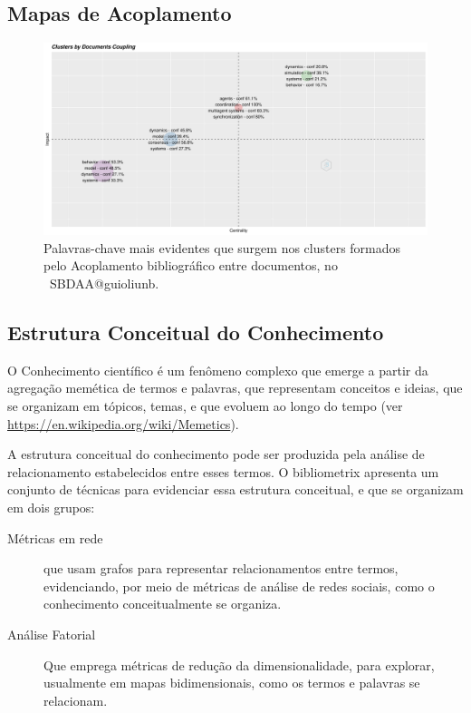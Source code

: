 \subsection{Mapas de Acoplamento}

\begin{figure}
    \centering
    \includegraphics[width=1\textwidth]{experiments/jhcf/PesqBibliogr/SimulacaoMultiagente/WoS-20220203/Clustering/MASSA2-CouplingMap-4Labels-Per-Cluster.png}
    \caption{Palavras-chave mais evidentes que surgem nos clusters formados pelo Acoplamento bibliográfico entre documentos, no  \dataset\ SBDAA@guioliunb.}
    \label{fig:MASSA2-CouplingMap-4Labels-Per-Cluster}
\end{figure}


\subsection{Estrutura Conceitual do Conhecimento}

O Conhecimento científico é um fenômeno complexo que emerge a partir da agregação memética de termos e palavras, que representam conceitos e ideias, que se organizam em tópicos, temas, e que evoluem ao longo do tempo (ver \url{https://en.wikipedia.org/wiki/Memetics}).

A estrutura conceitual do conhecimento pode ser produzida pela análise de relacionamento estabelecidos entre esses termos. O bibliometrix apresenta um conjunto de técnicas para evidenciar essa estrutura conceitual, e que se organizam em dois grupos:
\begin{description}
    \item [Métricas em rede] que usam grafos para representar relacionamentos entre termos, evidenciando, por meio de métricas de análise de redes sociais, como o conhecimento conceitualmente se organiza.
    \item [Análise Fatorial] Que emprega métricas de redução da dimensionalidade, para explorar, usualmente em mapas bidimensionais, como os termos e palavras se relacionam. 
\end{description}

